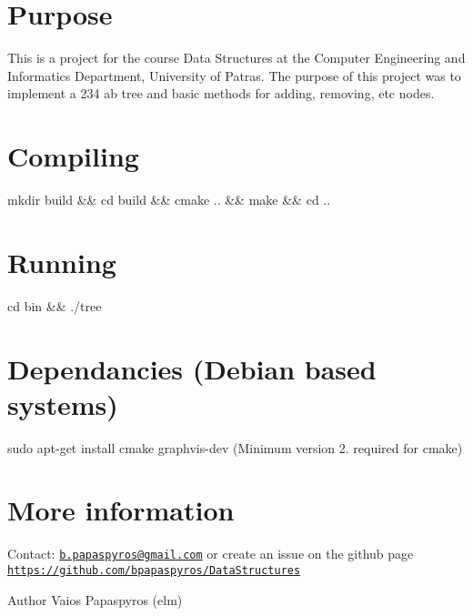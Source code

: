 \hypertarget{index_intro_sec}{}\section{Purpose}\label{index_intro_sec}
This is a project for the course Data Structures at the Computer Engineering and Informatics Department, University of Patras. The purpose of this project was to implement a 234 ab tree and basic methods for adding, removing, etc nodes.\hypertarget{index_compile_sec}{}\section{Compiling}\label{index_compile_sec}
\begin{center} mkdir build \&\& cd build \&\& cmake .. \&\& make \&\& cd .. \end{center} \hypertarget{index_run_sec}{}\section{Running}\label{index_run_sec}
\begin{center} cd bin \&\& ./tree \end{center} \hypertarget{index_dep_sec}{}\section{Dependancies (\-Debian based systems)}\label{index_dep_sec}
\begin{center} sudo apt-\/get install cmake graphvis-\/dev (Minimum version 2. required for cmake) \end{center} \hypertarget{index_info_sec}{}\section{More information}\label{index_info_sec}
Contact\-: \href{mailto:b.papaspyros@gmail.com}{\tt b.\-papaspyros@gmail.\-com} or create an issue on the github page \href{https://github.com/bpapaspyros/DataStructures}{\tt https\-://github.\-com/bpapaspyros/\-Data\-Structures}

\begin{DoxyAuthor}{Author}
Vaios Papaspyros (elm) 
\end{DoxyAuthor}
